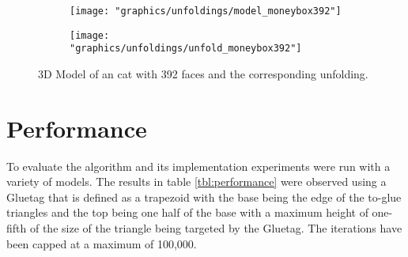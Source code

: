 \documentclass[draft,final]{vutinfth} %
\begin{document}
\begin{figure}
  \begin{subfigure}[b]{0.5\textwidth}
    \texttt{[image: "graphics/unfoldings/model\_moneybox392"]}
  \end{subfigure}
  \begin{subfigure}[b]{0.5\textwidth}
    \texttt{[image: "graphics/unfoldings/unfold\_moneybox392"]}
  \end{subfigure}
  
  \caption{3D Model of an cat with 392 faces and the corresponding unfolding.}
  \label{fig:moneybox392}
\end{figure}

\section{Performance}
\label{sec:performance}

To evaluate the algorithm and its implementation experiments were run with a variety of models. The results in table \ref{tbl:performance} were observed using a Gluetag that is defined as a trapezoid with the base being the edge of the to-glue triangles and the top being one half of the base with a maximum height of one-fifth of the size of the triangle being targeted by the Gluetag. The iterations have been capped at a maximum of 100,000.
\end{document}
